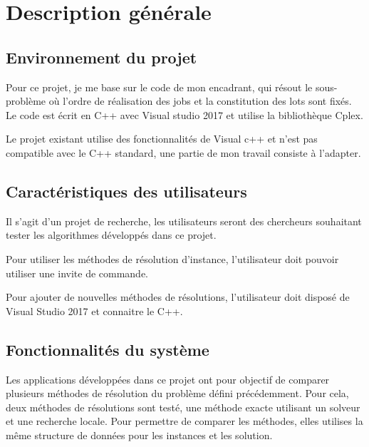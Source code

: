\chapter{Description générale}

\section{Environnement du projet}
Pour ce projet, je me base sur le code de mon encadrant, qui résout le sous-problème où l'ordre de réalisation des jobs et la constitution des lots sont fixés.
Le code est écrit en C++ avec Visual studio 2017 et utilise la bibliothèque Cplex.

Le projet existant utilise des fonctionnalités de Visual c++ et n'est pas compatible avec le C++ standard,
 une partie de mon travail consiste à l'adapter.
\section{Caractéristiques des utilisateurs}
Il s'agit d'un projet de recherche, les utilisateurs seront des chercheurs souhaitant tester les algorithmes développés dans ce projet.

Pour utiliser les méthodes de résolution d'instance, 
l'utilisateur doit pouvoir utiliser une invite de commande.

Pour ajouter de nouvelles méthodes de résolutions,
l'utilisateur doit disposé de Visual Studio 2017 et connaitre le C++.

\section{Fonctionnalités du système}
Les applications développées dans ce projet ont pour objectif de comparer plusieurs méthodes de résolution du problème défini précédemment.
Pour cela, deux méthodes de résolutions sont testé,  une méthode exacte utilisant un solveur et une recherche locale.
Pour permettre de comparer les méthodes, elles utilises la même structure de données pour les instances et les solution.


